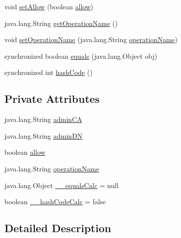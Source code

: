 \begin{DoxyCompactItemize}
void \hyperlink{classorg_1_1glite_1_1security_1_1voms_1_1ACLEntry_a1abfd96cf2fe4f6feef46138a5059a3e}{setAllow} (boolean \hyperlink{classorg_1_1glite_1_1security_1_1voms_1_1ACLEntry_a9027e97cddd9c2358783a1ce1df00979}{allow})
\item 
java.lang.String \hyperlink{classorg_1_1glite_1_1security_1_1voms_1_1ACLEntry_a153534d0ae93a576795367020dfaf44c}{getOperationName} ()
\item 
void \hyperlink{classorg_1_1glite_1_1security_1_1voms_1_1ACLEntry_a45ef81e0902481bf84d631b2c3184d2a}{setOperationName} (java.lang.String \hyperlink{classorg_1_1glite_1_1security_1_1voms_1_1ACLEntry_a77b8300ffe00ce97ec1a27eb245b4a0e}{operationName})
\item 
synchronized boolean \hyperlink{classorg_1_1glite_1_1security_1_1voms_1_1ACLEntry_a6730d8f4f4655ea22db94b98dcb0d89a}{equals} (java.lang.Object obj)
\item 
synchronized int \hyperlink{classorg_1_1glite_1_1security_1_1voms_1_1ACLEntry_a3843063b904124dcedf90f2866c1f117}{hashCode} ()
\end{DoxyCompactItemize}
\subsection*{Private Attributes}
\begin{DoxyCompactItemize}
\item 
java.lang.String \hyperlink{classorg_1_1glite_1_1security_1_1voms_1_1ACLEntry_a0f569a1e865cbaaccd567fc21dc366c0}{adminCA}
\item 
java.lang.String \hyperlink{classorg_1_1glite_1_1security_1_1voms_1_1ACLEntry_a9addfee20d8b6819f2f356c71e33babb}{adminDN}
\item 
boolean \hyperlink{classorg_1_1glite_1_1security_1_1voms_1_1ACLEntry_a9027e97cddd9c2358783a1ce1df00979}{allow}
\item 
java.lang.String \hyperlink{classorg_1_1glite_1_1security_1_1voms_1_1ACLEntry_a77b8300ffe00ce97ec1a27eb245b4a0e}{operationName}
\item 
java.lang.Object \hyperlink{classorg_1_1glite_1_1security_1_1voms_1_1ACLEntry_a6afa745bb49f8a8ceb5fb005e27b3fdc}{\_\-\_\-equalsCalc} = null
\item 
boolean \hyperlink{classorg_1_1glite_1_1security_1_1voms_1_1ACLEntry_a2503a408cc317ca2fd71c5205efd3872}{\_\-\_\-hashCodeCalc} = false
\end{DoxyCompactItemize}


\subsection{Detailed Description}


